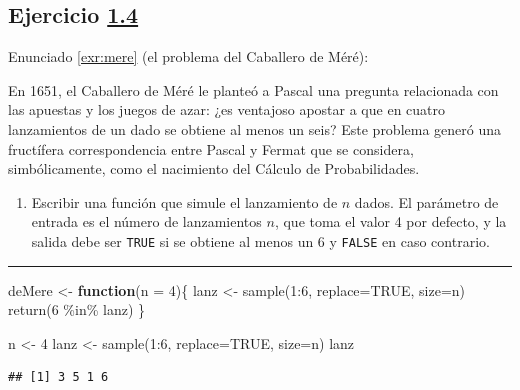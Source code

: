\documentclass[
]{book}
\newenvironment{Shaded}{\begin{snugshade}}{\end{snugshade}}
\newcommand{\AttributeTok}[1]{\textcolor[rgb]{0.77,0.63,0.00}{#1}}
\newcommand{\ConstantTok}[1]{\textcolor[rgb]{0.00,0.00,0.00}{#1}}
\newcommand{\ControlFlowTok}[1]{\textcolor[rgb]{0.13,0.29,0.53}{\textbf{#1}}}
\newcommand{\DecValTok}[1]{\textcolor[rgb]{0.00,0.00,0.81}{#1}}
\newcommand{\FunctionTok}[1]{\textcolor[rgb]{0.00,0.00,0.00}{#1}}
\newcommand{\NormalTok}[1]{#1}
\newcommand{\OtherTok}[1]{\textcolor[rgb]{0.56,0.35,0.01}{#1}}
\newcommand{\SpecialCharTok}[1]{\textcolor[rgb]{0.00,0.00,0.00}{#1}}
\providecommand{\tightlist}{%
  \setlength{\itemsep}{0pt}\setlength{\parskip}{0pt}}
\theoremstyle{break}
\theoremstyle{nonumberplain}
\begin{document}
\hypertarget{sol-mere}{%
\subsection{\texorpdfstring{Ejercicio \href{ejercicios.html\#exr:mere}{1.4}}{Ejercicio 1.4}}\label{sol-mere}}

Enunciado \ref{exr:mere} (el problema del Caballero de Méré):

En 1651, el Caballero de Méré le planteó a Pascal una pregunta
relacionada con las apuestas y los juegos de azar: ¿es ventajoso
apostar a que en cuatro lanzamientos de un dado se obtiene al menos
un seis? Este problema generó una fructífera correspondencia entre
Pascal y Fermat que se considera, simbólicamente, como el nacimiento
del Cálculo de Probabilidades.

\begin{enumerate}
\def\labelenumi{\alph{enumi})}
\tightlist
\item
  Escribir una función que simule el lanzamiento de \(n\) dados. El
  parámetro de entrada es el número de lanzamientos \(n\), que toma
  el valor 4 por defecto, y la salida debe ser \texttt{TRUE} si se
  obtiene al menos un 6 y \texttt{FALSE} en caso contrario.
\end{enumerate}

\begin{center}\rule{0.5\linewidth}{0.5pt}\end{center}

\begin{Shaded}
\begin{Highlighting}[]
\NormalTok{deMere }\OtherTok{\textless{}{-}} \ControlFlowTok{function}\NormalTok{(}\AttributeTok{n =} \DecValTok{4}\NormalTok{)\{}
\NormalTok{  lanz }\OtherTok{\textless{}{-}} \FunctionTok{sample}\NormalTok{(}\DecValTok{1}\SpecialCharTok{:}\DecValTok{6}\NormalTok{, }\AttributeTok{replace=}\ConstantTok{TRUE}\NormalTok{, }\AttributeTok{size=}\NormalTok{n)}
  \FunctionTok{return}\NormalTok{(}\DecValTok{6} \SpecialCharTok{\%in\%}\NormalTok{ lanz)}
\NormalTok{\}}

\NormalTok{n }\OtherTok{\textless{}{-}} \DecValTok{4}
\NormalTok{lanz }\OtherTok{\textless{}{-}} \FunctionTok{sample}\NormalTok{(}\DecValTok{1}\SpecialCharTok{:}\DecValTok{6}\NormalTok{, }\AttributeTok{replace=}\ConstantTok{TRUE}\NormalTok{, }\AttributeTok{size=}\NormalTok{n)}
\NormalTok{lanz}
\end{Highlighting}
\end{Shaded}

\begin{verbatim}
## [1] 3 5 1 6
\end{verbatim}
\end{document}
